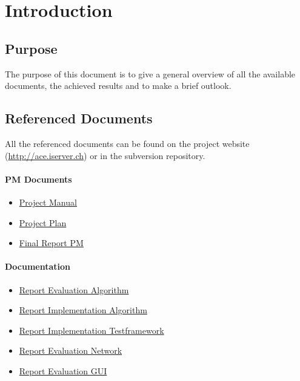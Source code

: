 \documentclass[11pt,a4paper]{article}
\begin{document}
\setlength{\parindent}{0pt}


\newpage

\tableofcontents
\newpage

\listoftables
\listoffigures
\newpage


\section{Introduction}
\subsection{Purpose}
The purpose of this document is to give a general overview of all the available documents, the achieved results and to make a brief outlook.

\subsection{Referenced Documents}
All the referenced documents can be found on the project website (\href{http://ace.iserver.ch/}{http://ace.iserver.ch}) or in the subversion repository.

\paragraph{PM Documents}
\begin{itemize}
 \item \href{http://ace.iserver.ch:81/repos/ace/ace/trunk/doc/pdf/projectmanual.pdf}{Project Manual}
 \item \href{http://ace.iserver.ch:81/repos/ace/ace/trunk/doc/pdf/projektplan.pdf}{Project Plan}
 \item \href{http://ace.iserver.ch:81/repos/ace/ace/trunk/doc/pdf/erfahrungsbericht.pdf}{Final Report PM}
\end{itemize}

\paragraph{Documentation}
\begin{itemize}
 \item \href{http://ace.iserver.ch:81/repos/ace/ace/trunk/doc/pdf/algorithm.pdf}{Report Evaluation Algorithm}
 \item \href{http://ace.iserver.ch:81/repos/ace/ace/trunk/doc/pdf/implementation-algorithm.pdf}{Report Implementation Algorithm}
 \item \href{http://ace.iserver.ch:81/repos/ace/ace/trunk/doc/pdf/testframework.pdf}{Report Implementation Testframework}
 \item \href{http://ace.iserver.ch:81/repos/ace/ace/trunk/doc/pdf/network.pdf}{Report Evaluation Network}
 \item \href{http://ace.iserver.ch:81/repos/ace/ace/trunk/doc/pdf/gui.pdf}{Report Evaluation GUI}
\end{itemize}
\end{document}
